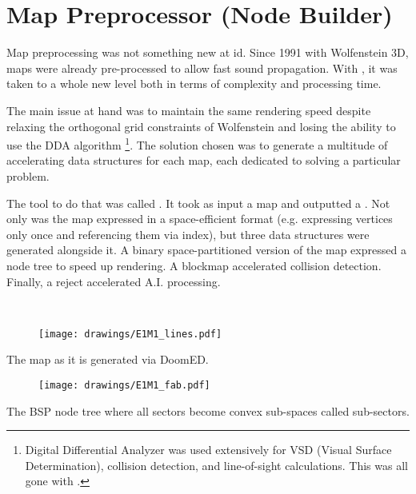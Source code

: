 \section{Map Preprocessor (Node Builder)}
Map preprocessing was not something new at id. Since 1991 with Wolfenstein 3D, maps were already pre-processed to allow fast sound propagation. With \doom, it was taken to a whole new level both in terms of complexity and processing time.\\
\par
The main issue at hand was to maintain the same rendering speed despite relaxing the orthogonal grid constraints of Wolfenstein and losing the ability to use the DDA algorithm \footnote{Digital Differential Analyzer was used extensively for VSD (Visual Surface Determination), collision detection, and line-of-sight calculations. This was all gone with \doom.}. The solution chosen was to generate a multitude of accelerating data structures for each map, each dedicated to solving a particular problem.\\
\par
 The tool to do that was called . It took as input a  map and outputted a . Not only was the map expressed in a space-efficient format (e.g. expressing vertices only once and referencing them via index), but three data structures were generated alongside it. A binary space-partitioned version of the map expressed a node tree to speed up rendering. A blockmap accelerated collision detection. Finally, a reject accelerated A.I. processing.\\
 \par
{}\\%
\par
{}
\par


%
\begin{figure}[H]
\vspace*{3mm}
\centering
\texttt{[image: drawings/E1M1\_lines.pdf]}
\end{figure}
\par
The map as it is generated via DoomED.\\
\par
\begin{figure}[H]
\vspace*{2mm}
\centering
\texttt{[image: drawings/E1M1\_fab.pdf]}
\end{figure}
The BSP node tree where all sectors become convex sub-spaces called sub-sectors.



